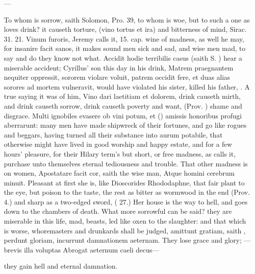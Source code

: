 {{---

To whom is sorrow, saith Solomon, Pro.  39, to whom is woe, but
to such a one as loves drink? it causeth torture, (vino tortus et ira)
and bitterness of mind, Sirac. 31. 21. Vinum furoris, Jeremy calls it,
15. cap. wine of madness, as well he may, for insanire facit sanos, it
makes sound men sick and sad, and wise men mad, to say and do
they know not what. Accidit hodie terribilis casus (saith S.
\Austin{}) hear a miserable accident; Cyrillus' son this day in his drink,
Matrem praegnantem nequiter oppressit, sororem violare voluit, patrem
occidit fere, et duas alias sorores ad mortem vulneravit, would have
violated his sister, killed his father, \etc{}. A true saying it was of
him, Vino dari laetitiam et dolorem, drink causeth mirth, and drink
causeth sorrow, drink causeth poverty and want, (Prov. ) shame and
disgrace. Multi ignobiles evasere ob vini potum, et (\Austin{}) amissis
honoribus profugi aberrarunt: many men have made shipwreck of their
fortunes, and go like rogues and beggars, having turned all their
substance into aurum potabile, that otherwise might have lived in good
worship and happy estate, and for a few hours' pleasure, for their
Hilary term's but short, or free madness, as \Seneca calls it,
purchase unto themselves eternal tediousness and trouble.
That other madness is on women, Apostatare facit cor, saith the wise
man, Atque homini cerebrum minuit. Pleasant at first she is, like
Dioscorides Rhododaphne, that fair plant to the eye, but poison to the
taste, the rest as bitter as wormwood in the end (Prov.  4.) and
sharp as a two-edged sword, ( 27.) Her house is the way to hell,
and goes down to the chambers of death. What more sorrowful can be
said? they are miserable in this life, mad, beasts, led like oxen
to the slaughter: and that which is worse, whoremasters and drunkards
shall be judged, amittunt gratiam, saith \Austin{}, perdunt gloriam,
incurrunt damnationem aeternam. They lose grace and glory;
---brevis illa voluptas
Abrogat aeternum caeli decus---

they gain hell and eternal damnation.

}}
